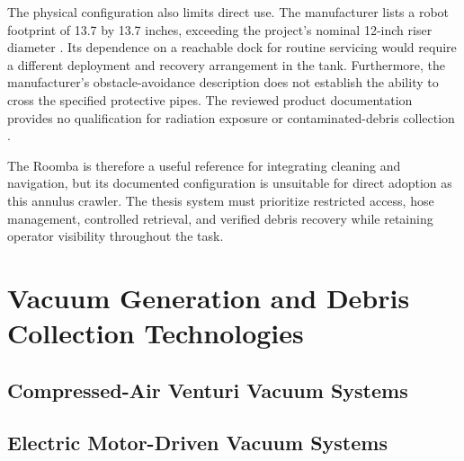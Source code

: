 The physical configuration also limits direct use. The manufacturer lists a robot footprint of 13.7 by 13.7 inches, exceeding the project's nominal 12-inch riser diameter \citep{irobotComboJ9Specifications}. Its dependence on a reachable dock for routine servicing would require a different deployment and recovery arrangement in the tank. Furthermore, the manufacturer's obstacle-avoidance description does not establish the ability to cross the specified protective pipes. The reviewed product documentation provides no qualification for radiation exposure or contaminated-debris collection \citep{irobot2023ComboJ9Facts,irobotComboJ9Specifications}.

The Roomba is therefore a useful reference for integrating cleaning and navigation, but its documented configuration is unsuitable for direct adoption as this annulus crawler. The thesis system must prioritize restricted access, hose management, controlled retrieval, and verified debris recovery while retaining operator visibility throughout the task.
\par
\endgroup

\section[Vacuum Generation and Debris Collection Technologies]{Vacuum Generation and Debris\\Collection Technologies}
\label{sec:vacuum-technologies}

\subsection{Compressed-Air Venturi Vacuum Systems}
\label{sec:venturi-vacuums}

\subsection{Electric Motor-Driven Vacuum Systems}
\label{sec:electric-vacuums}

